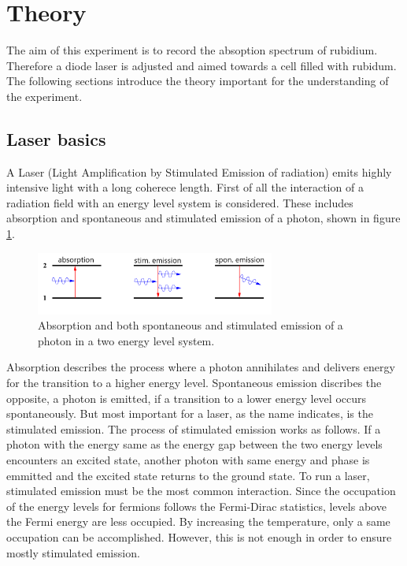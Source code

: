 \section{Theory}
\label{sec:theory}
The aim of this experiment is to record the absoption spectrum
of rubidium. Therefore a diode laser is adjusted and aimed towards a cell
filled with rubidum.
The following sections introduce the theory
important for the understanding of the experiment.

\subsection{Laser basics}
\label{subsec:Laser}
A Laser (Light Amplification by Stimulated Emission of radiation)
emits highly intensive light with a long coherece length.
First of all the interaction of a radiation field with
an energy level system is considered. These includes
absorption and spontaneous and stimulated emission
of a photon, shown in figure \ref{fig:ab_em}.
\begin{figure}
\centering
\includegraphics[width=0.7\textwidth]{ab_und_emiss.png}
\caption{Absorption and both spontaneous and stimulated emission of a photon in a two energy level system.
\cite{V61}}
\label{fig:ab_em}
\end{figure}
Absorption describes the process where a photon annihilates and
delivers energy for the transition
to a higher energy level.
Spontaneous emission discribes the opposite, a photon is
emitted, if a transition to a lower energy
level occurs spontaneously.
But most important for a laser, as the name indicates,
is the stimulated emission.
The process of stimulated emission works as follows.
If a photon with the energy same as
the energy gap between the two energy levels
encounters an excited state, another photon with
same energy and phase is emmitted and the excited state
returns to the ground state.
To run a laser, stimulated emission must be the most common interaction.
Since the occupation of the energy levels for fermions follows
the Fermi-Dirac statistics, %
levels above the Fermi energy are
less occupied. By increasing the temperature, only
a same occupation can be accomplished.
However, this is not enough in order to ensure mostly stimulated emission.
